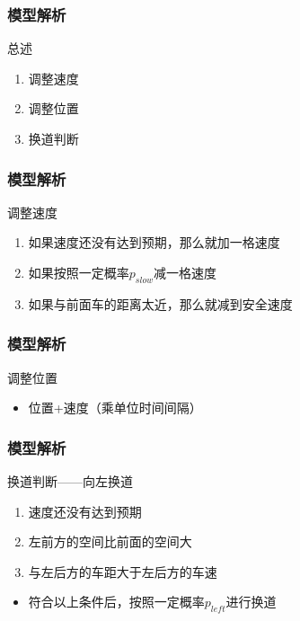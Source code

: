 \documentclass{beamer}
\begin{document}
	\begin{frame}
		\frametitle{模型解析}
		\begin{block}{总述}
			\begin{enumerate}[Step 1.]
				\item<2-> 调整速度
				\item<3-> 调整位置
				\item<4-> 换道判断
			\end{enumerate}
		\end{block}
	\end{frame}
	
	\begin{frame}
		\frametitle{模型解析}
		\begin{block}{调整速度}
			\begin{enumerate}[Step 1.]
				\item<2-> 如果速度还没有达到预期，那么就加一格速度
				\item<3-> 如果按照一定概率$p_{slow}$减一格速度
				\item<4-> 如果与前面车的距离太近，那么就减到安全速度
			\end{enumerate}
		\end{block}
	\end{frame}
	
	\begin{frame}
		\frametitle{模型解析}
		\begin{block}{调整位置}
			\begin{itemize}
				\item<2-> 位置+速度（乘单位时间间隔）
			\end{itemize}
		\end{block}
	\end{frame}
	
	\begin{frame}
		\frametitle{模型解析}
		\begin{block}{换道判断——向左换道}
			\begin{enumerate}[{Condition} 1.]
				\item<2-> 速度还没有达到预期
				\item<3-> 左前方的空间比前面的空间大
				\item<4-> 与左后方的车距大于左后方的车速
			\end{enumerate}
			\begin{itemize}
				\item<5-> 符合以上条件后，按照一定概率$p_{left}$进行换道
			\end{itemize}
		\end{block}
	\end{frame}
	
\end{document}
